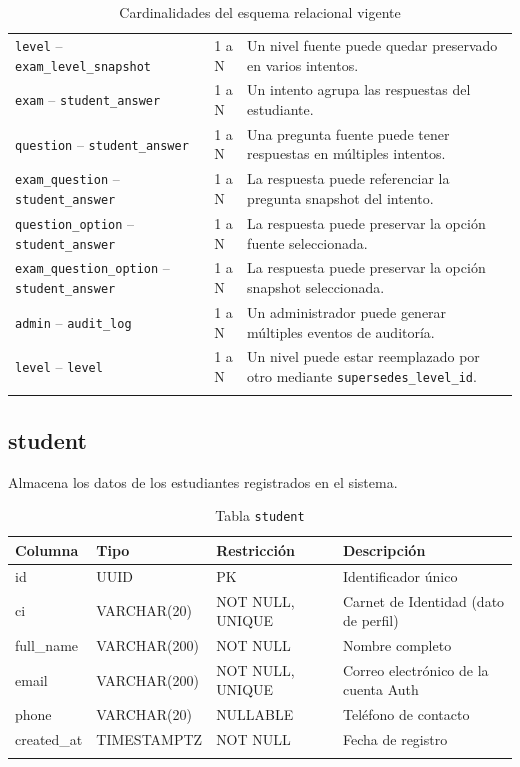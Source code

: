 \begin{longtable}{p{4cm} p{2.5cm} p{7cm}}
\texttt{level} -- \texttt{exam\_level\_snapshot} & 1 a N & Un nivel fuente puede quedar preservado en varios intentos. \\
\texttt{exam} -- \texttt{student\_answer} & 1 a N & Un intento agrupa las respuestas del estudiante. \\
\texttt{question} -- \texttt{student\_answer} & 1 a N & Una pregunta fuente puede tener respuestas en múltiples intentos. \\
\texttt{exam\_question} -- \texttt{student\_answer} & 1 a N & La respuesta puede referenciar la pregunta snapshot del intento. \\
\texttt{question\_option} -- \texttt{student\_answer} & 1 a N & La respuesta puede preservar la opción fuente seleccionada. \\
\texttt{exam\_question\_option} -- \texttt{student\_answer} & 1 a N & La respuesta puede preservar la opción snapshot seleccionada. \\
\texttt{admin} -- \texttt{audit\_log} & 1 a N & Un administrador puede generar múltiples eventos de auditoría. \\
\texttt{level} -- \texttt{level} & 1 a N & Un nivel puede estar reemplazado por otro mediante \texttt{supersedes\_level\_id}. \\
\bottomrule
\caption{Cardinalidades del esquema relacional vigente}
\label{tab:relaciones-esquema}
\end{longtable}

\subsection{student}

Almacena los datos de los estudiantes registrados en el sistema.

\begin{longtable}{l l l p{5cm}}
\toprule
\textbf{Columna} & \textbf{Tipo} & \textbf{Restricción} & \textbf{Descripción} \\
\midrule
\endhead
id & UUID & PK & Identificador único \\
ci & VARCHAR(20) & NOT NULL, UNIQUE & Carnet de Identidad (dato de perfil) \\
full\_name & VARCHAR(200) & NOT NULL & Nombre completo \\
email & VARCHAR(200) & NOT NULL, UNIQUE & Correo electrónico de la cuenta Auth \\
phone & VARCHAR(20) & NULLABLE & Teléfono de contacto \\
created\_at & TIMESTAMPTZ & NOT NULL & Fecha de registro \\
\bottomrule
\caption{Tabla \texttt{student}}
\end{longtable}

